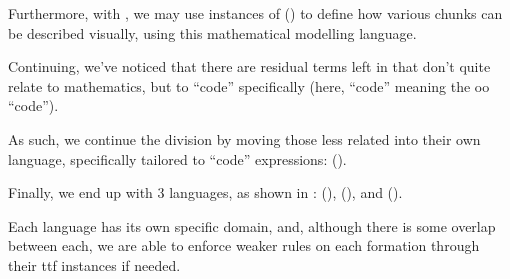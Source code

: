 Furthermore, with \ModelExpr{}, we may use instances of \Express{}
() to define how various chunks can be described
visually, using this mathematical modelling language.

\currentExpressHaskell{}

Continuing, we've noticed that there are residual terms left in \Expr{} that
don't quite relate to mathematics, but to ``code'' specifically (here, ``code''
meaning the \acs{oo} ``code'').

As such, we continue the division by moving those less related into their own
language, specifically tailored to ``code'' expressions: \CodeExpr{} ().




Finally, we end up with 3 languages, as shown in : \Expr{}
(), \ModelExpr{} (), and
\CodeExpr{} ().

Each language has its own specific domain, and, although there is some overlap
between each, we are able to enforce weaker rules on each formation through
their \acs{ttf} instances if needed.

